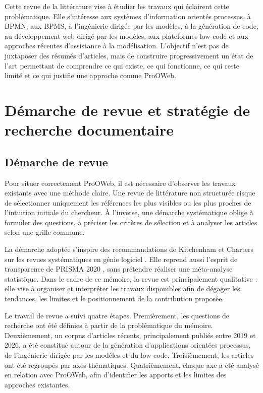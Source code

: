 \documentclass[12pt,a4paper]{article}
\begin{document}
Cette revue de la littérature vise à étudier les travaux qui éclairent cette problématique. Elle s'intéresse aux systèmes d'information orientés processus, à BPMN, aux BPMS, à l'ingénierie dirigée par les modèles, à la génération de code, au développement web dirigé par les modèles, aux plateformes low-code et aux approches récentes d'assistance à la modélisation. L'objectif n'est pas de juxtaposer des résumés d'articles, mais de construire progressivement un état de l'art permettant de comprendre ce qui existe, ce qui fonctionne, ce qui reste limité et ce qui justifie une approche comme ProOWeb.

\section{Démarche de revue et stratégie de recherche documentaire}

\subsection{Démarche de revue}

Pour situer correctement ProOWeb, il est nécessaire d'observer les travaux existants avec une méthode claire. Une revue de littérature non structurée risque de sélectionner uniquement les références les plus visibles ou les plus proches de l'intuition initiale du chercheur. À l'inverse, une démarche systématique oblige à formuler des questions, à préciser les critères de sélection et à analyser les articles selon une grille commune.

La démarche adoptée s'inspire des recommandations de Kitchenham et Charters sur les revues systématiques en génie logiciel \cite{kitchenham2007}. Elle reprend aussi l'esprit de transparence de PRISMA 2020 \cite{prisma2020}, sans prétendre réaliser une méta-analyse statistique. Dans le cadre de ce mémoire, la revue est principalement qualitative : elle vise à organiser et interpréter les travaux disponibles afin de dégager les tendances, les limites et le positionnement de la contribution proposée.

Le travail de revue a suivi quatre étapes. Premièrement, les questions de recherche ont été définies à partir de la problématique du mémoire. Deuxièmement, un corpus d'articles récents, principalement publiés entre 2019 et 2026, a été constitué autour de la génération d'applications orientées processus, de l'ingénierie dirigée par les modèles et du low-code. Troisièmement, les articles ont été regroupés par axes thématiques. Quatrièmement, chaque axe a été analysé en relation avec ProOWeb, afin d'identifier les apports et les limites des approches existantes.
\end{document}
